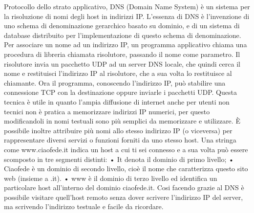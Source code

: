 Protocollo dello strato applicativo, DNS (Domain Name System) è un sistema per la risoluzione di nomi degli host in indirizzi IP. 
L’essenza di DNS è l’invenzione di uno schema di denominazione gerarchico basato su dominio, e di un sistema di database distribuito per l’implementazione di questo schema di denominazione.
Per associare un nome ad un indirizzo IP, un programma applicativo chiama una procedura di libreria chiamata risolutore, passando il nome come parametro. Il risolutore invia un pacchetto UDP ad un server DNS locale, che quindi cerca il nome e restituisci l’indirizzo IP al risolutore, che a sua volta lo restituisce al chiamante. Ora il programma, conoscendo l’indirizzo IP, può stabilire una connessione TCP con la destinazione oppure inviarle i pacchetti UDP.
Questa tecnica è utile in quanto l’ampia diffusione di internet anche per utenti non tecnici non è pratica a memorizzare indirizzi IP numerici, per questo modificandoli in nomi testuali sono più semplici da memorizzare e utilizzare.
È possibile inoltre attribuire più nomi allo stesso indirizzo IP (o viceversa) per rappresentare diversi servizi o funzioni forniti da uno stesso host.
Una stringa come www.ciaofede.it indica un host a cui ti sei connesso e a sua volta può essere scomposto in tre segmenti distinti:
•	It denota il dominio di primo livello;
•	Ciaofede è un dominio di secondo livello, cioè il nome che caratterizza questo sito web (insieme a .it).
•	www è il dominio di terzo livello ed identifica un particolare host all’interno del dominio ciaofede.it.
Cosi facendo grazie al DNS è possibile visitare quell’host remoto senza dover scrivere l’indirizzo IP del server, ma scrivendo l’indirizzo testuale e facile da ricordare.
 